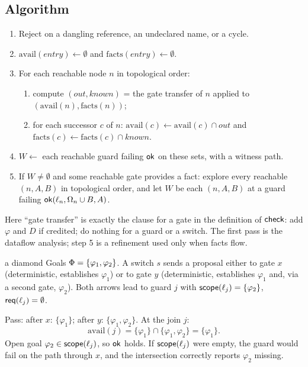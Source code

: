 \subsection{Algorithm}

\begin{center}
\begin{minipage}{0.92\textwidth}
\begin{tcolorbox}[enhanced,colback=tintblue!4,colframe=tintblue,title={Algorithm: checking a hierarchy graph (paper, Algorithm 1)},fonttitle=\bfseries]
\begin{enumerate}[leftmargin=1.4em,itemsep=0.1em]
\item Reject on a dangling reference, an undeclared name, or a cycle.
\item $\mathrm{avail}(\mathit{entry})\gets\emptyset$ and $\mathrm{facts}(\mathit{entry})\gets\emptyset$.
\item For each reachable node $n$ in topological order:
  \begin{enumerate}[label=(\alph*),itemsep=0.05em]
  \item compute $(\mathit{out},\mathit{known})$ = the gate transfer of $n$ applied to $(\mathrm{avail}(n),\mathrm{facts}(n))$;
  \item for each successor $c$ of $n$: $\mathrm{avail}(c)\gets\mathrm{avail}(c)\cap\mathit{out}$ and $\mathrm{facts}(c)\gets\mathrm{facts}(c)\cap\mathit{known}$.
  \end{enumerate}
\item $W\gets$ each reachable guard failing $\mathsf{ok}$ on these sets, with a witness path.
\item If $W\ne\emptyset$ and some reachable gate provides a fact: explore every reachable $(n,A,B)$ in topological order, and let $W$ be each $(n,A,B)$ at a guard failing $\mathsf{ok}(\ell_n,\Omega_n\cup B,A)$.
\end{enumerate}
\end{tcolorbox}
\end{minipage}
\end{center}

Here ``gate transfer'' is exactly the clause for a gate in the definition of $\mathsf{check}$: add $\varphi$ and $D$ if credited; do nothing for a guard or a switch. The first pass is the dataflow analysis; step 5 is a refinement used only when facts flow.

\begin{example}{a diamond}
Goals $\Phi=\{\varphi_1,\varphi_2\}$. A switch $s$ sends a proposal either to gate $x$ (deterministic, establishes $\varphi_1$) or to gate $y$ (deterministic, establishes $\varphi_1$ and, via a second gate, $\varphi_2$). Both arrows lead to guard $j$ with $\mathsf{scope}(\ell_j)=\{\varphi_2\}$, $\mathsf{req}(\ell_j)=\emptyset$.

Pass: after $x$: $\{\varphi_1\}$; after $y$: $\{\varphi_1,\varphi_2\}$. At the join $j$:
\[
\mathrm{avail}(j)=\{\varphi_1\}\cap\{\varphi_1,\varphi_2\}=\{\varphi_1\}.
\]
Open goal $\varphi_2\in\mathsf{scope}(\ell_j)$, so $\mathsf{ok}$ holds. If $\mathsf{scope}(\ell_j)$ were empty, the guard would fail on the path through $x$, and the intersection correctly reports $\varphi_2$ missing.
\end{example}

